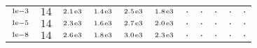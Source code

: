 \begin{tiny}
\begin{tabular}{@{$\;$}c@{$\;$}|@{$\;$}c@{$\;$}@{$\;$}c@{$\;$}@{$\;$}c@{$\;$}@{$\;$}c@{$\;$}@{$\;$}c@{$\;$}|@{$\;$}c@{$\;$}@{$\;$}c@{$\;$}@{$\;$}c@{$\;$}@{$\;$}c@{$\;$}@{$\;$}c@{$\;$}}
$\scriptstyle1\!\mathrm{\hspace{0.10em}e}-3$ & $\scriptstyle14$ & $\scriptstyle2.1\mathrm{\hspace{0.10em}e}3$ & $\scriptstyle1.4\mathrm{\hspace{0.10em}e}3$ & $\scriptstyle2.5\mathrm{\hspace{0.10em}e}3$ & $\scriptstyle1.8\mathrm{\hspace{0.10em}e}3$ & $\scriptstyle.$ & $\scriptstyle.$ & $\scriptstyle.$ & $\scriptstyle.$ & $\scriptstyle.$\\ 
$\scriptstyle1\!\mathrm{\hspace{0.10em}e}-5$ & $\scriptstyle14$ & $\scriptstyle2.3\mathrm{\hspace{0.10em}e}3$ & $\scriptstyle1.6\mathrm{\hspace{0.10em}e}3$ & $\scriptstyle2.7\mathrm{\hspace{0.10em}e}3$ & $\scriptstyle2.0\mathrm{\hspace{0.10em}e}3$ & $\scriptstyle.$ & $\scriptstyle.$ & $\scriptstyle.$ & $\scriptstyle.$ & $\scriptstyle.$\\ 
$\scriptstyle1\!\mathrm{\hspace{0.10em}e}-8$ & $\scriptstyle14$ & $\scriptstyle2.6\mathrm{\hspace{0.10em}e}3$ & $\scriptstyle1.8\mathrm{\hspace{0.10em}e}3$ & $\scriptstyle3.0\mathrm{\hspace{0.10em}e}3$ & $\scriptstyle2.3\mathrm{\hspace{0.10em}e}3$ & $\scriptstyle.$ & $\scriptstyle.$ & $\scriptstyle.$ & $\scriptstyle.$ & $\scriptstyle.$\\ 
\end{tabular} 
\end{tiny} 
